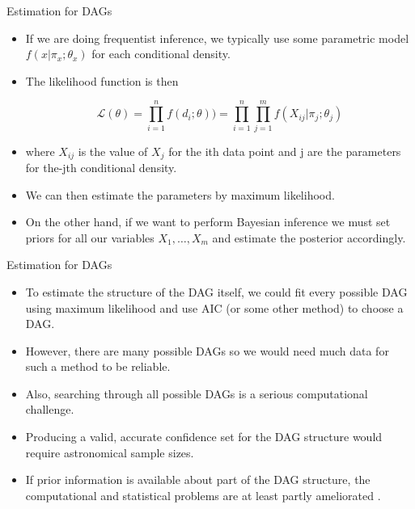 \documentclass[handout]{beamer}
\begin{document}
\begin{frame}{Estimation for DAGs}
\scriptsize{
\begin{itemize}

\item If we are doing frequentist inference, we typically use some parametric model $f(x|\pi_x;\theta_x)$ for each conditional density. 

\item The likelihood function is then

\begin{displaymath}
 \mathcal{L}(\theta) = \prod_{i=1}^nf(d_i;\theta) ) =  \prod_{i=1}^n\prod_{j=1}^mf(X_{ij}|\pi_j;\theta_j) 
\end{displaymath}

\item where $X_{ij}$ is the value of $X_j$ for the ith data point and j are the parameters for the-jth conditional density. 

\item We can then estimate the parameters by maximum likelihood.

\item On the other hand, if we want to perform Bayesian inference we must set priors for all our variables $X_1,\dots,X_m$ and estimate the posterior accordingly.

 
\end{itemize}



} 

\end{frame}

\begin{frame}{Estimation for DAGs}
\scriptsize{
\begin{itemize}

\item To estimate the structure of the DAG itself, we could fit every possible DAG
using maximum likelihood and use AIC (or some other method) to choose a
DAG. 

\item However, there are many possible DAGs so we would need much data
for such a method to be reliable.

\item Also, searching through all possible DAGs is a serious computational challenge. 

\item Producing a valid, accurate confidence set for the DAG structure would require astronomical sample sizes. 

\item If prior information is available about part of the DAG structure, the computational and statistical problems are at least partly ameliorated \cite{wasserman2013all}.

 
\end{itemize}



} 

\end{frame}
\end{document}
